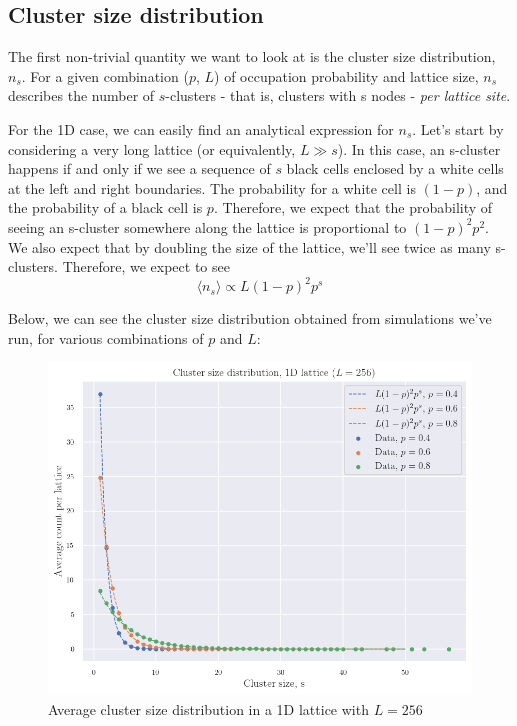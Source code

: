 \subsection{Cluster size distribution}

The first non-trivial quantity we want to look at is the cluster size distribution, $n_s$. For a given combination ($p$, $L$) of occupation probability and lattice size, $n_s$ describes the number of $s$-clusters - that is, clusters with s nodes - \textit{per lattice site}.

For the 1D case, we can easily find an analytical expression for $n_s$. Let's start by considering a very long lattice (or equivalently, $L \gg s$). In this case, an s-cluster happens if and only if we see a sequence of $s$ black cells enclosed by a white cells at the left and right boundaries. The probability for a white cell is $(1-p)$, and the probability of a black cell is $p$. Therefore, we expect that the probability of seeing an s-cluster somewhere along the lattice is proportional to $(1-p)^2 p^2$. We also expect that by doubling the size of the lattice, we'll see twice as many s-clusters. Therefore, we expect to see
\begin{equation}
  \langle n_s \rangle \propto L (1-p)^2 p^s \label{chap1_clust_size_dist}
\end{equation}

Below, we can see the cluster size distribution obtained from simulations we've run, for various combinations of $p$ and $L$:

\begin{figure}[h]
  \includegraphics[width=\linewidth]{Images/chap1_clust_size_dist_256.png}
  \caption{Average cluster size distribution in a 1D lattice with $L=256$}
  \label{fig:chap1_clust_size_dist_256}
\end{figure}



